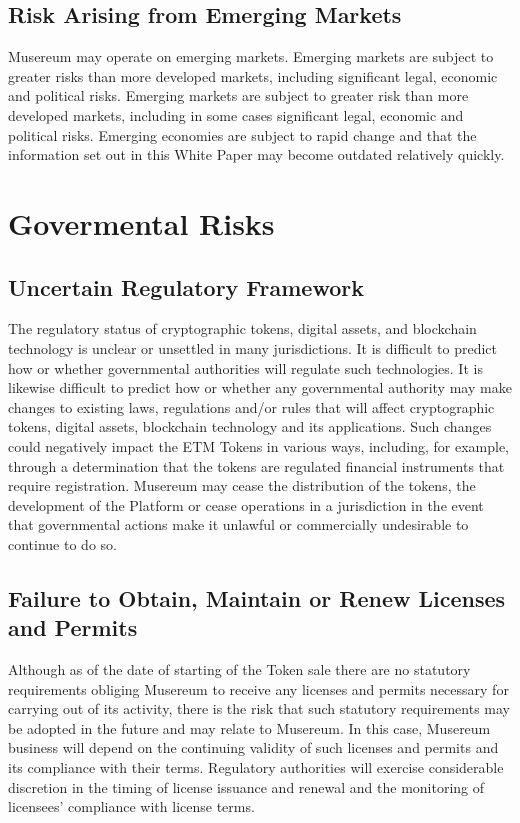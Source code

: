 \documentclass[12pt]{report}
\begin{document}
\subsection*{Risk Arising from Emerging Markets}
Musereum may operate on emerging markets. Emerging markets are subject to greater risks than more developed markets, including significant legal, economic and political risks. Emerging markets are subject to greater risk than more developed markets, including in some cases significant legal, economic and political risks. Emerging economies are subject to rapid change and that the information set out in this White Paper may become outdated relatively quickly.

\section{Govermental Risks}
\subsection*{Uncertain Regulatory Framework}
The regulatory status of cryptographic tokens, digital assets, and blockchain technology is unclear or unsettled in many jurisdictions. It is difficult to predict how or whether governmental authorities will regulate such technologies. It is likewise difficult to predict how or whether any governmental authority may make changes to existing laws, regulations and/or rules that will affect cryptographic tokens, digital assets, blockchain technology and its applications. Such changes could negatively impact the ETM Tokens in various ways, including, for example, through a determination that the tokens are regulated financial instruments that require registration. Musereum may cease the distribution of the tokens, the development of the Platform or cease operations in a jurisdiction in the event that governmental actions make it unlawful or commercially undesirable to continue to do so.

\subsection*{Failure to Obtain, Maintain or Renew Licenses and Permits}
Although as of the date of starting of the Token sale there are no statutory requirements obliging Musereum to receive any licenses and permits necessary for carrying out of its activity, there is the risk that such statutory requirements may be adopted in the future and may relate to Musereum. In this case, Musereum business will depend on the continuing validity of such licenses and permits and its compliance with their terms. Regulatory authorities will exercise considerable discretion in the timing of license issuance and renewal and the monitoring of licensees’ compliance with license terms.
\end{document}
